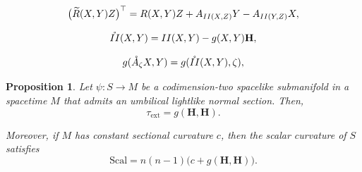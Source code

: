 \documentclass[10pt,a4paper]{amsart}
\newtheorem{proposition}{Proposition}
\begin{document}
	\begin{equation}
		\bigl(\widetilde{R}(X,Y)Z\bigr)^{\top} = R(X,Y)Z + A_{{\rm II}(X,Z)}Y - A_{{\rm II}(Y,Z)}X, \label{GaussEc}
	\end{equation}

	\begin{equation}\label{shear1}
		\mathring{{\rm II}}(X,Y) = {\rm II}(X,Y) - g(X,Y)\mathbf{H},
	\end{equation}

	\begin{equation}\label{shear3}
		g(\mathring{A}_\zeta X, Y) = g(\mathring{\rm II}(X,Y), \zeta),
	\end{equation}

\begin{proposition}\label{propo2}
	Let \(\psi\colon S\to M\) be a codimension-two spacelike submanifold in a spacetime \(M\) that admits an umbilical lightlike normal section. Then,
	\begin{equation}\label{ExtrinsicScalarH}
		\tau_{\mathrm{ext}} = g(\mathbf{H}, \mathbf{H}).
	\end{equation}
	
	Moreover, if \(M\) has constant sectional curvature \(c\), then the scalar curvature of $S$ satisfies
	\begin{equation}\label{Scal}
		\mathrm{Scal} = n(n-1)\bigl(c + g(\mathbf{H}, \mathbf{H})\bigr).
	\end{equation}
\end{proposition}
\end{document}
